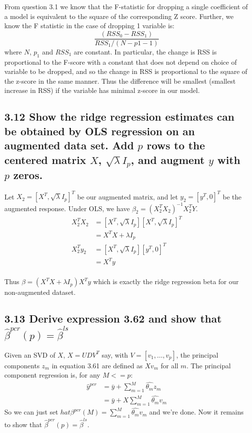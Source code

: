 From question 3.1 we know that the F-statistic for dropping a single coefficient of a model is equivalent to the square of the corresponding Z score.
Further, we know the F statistic in the case of dropping 1 variable is:
$$ \frac{\left(RSS_0 - RSS_1\right)}{RSS_1 / (N - p1 - 1)}$$
where $N$, $p_1$ and $RSS_1$ are constant. In particular, the change is RSS is proportional to the F-score with a constant that does not depend on choice of variable to be dropped, and so the change in RSS is proportional to the square of the z-score in the same manner. Thus the difference will be smallest (smallest increase in RSS) if the variable has minimal z-score in our model.
\subsection*{3.12 Show the ridge regression estimates can be obtained by OLS regression on an augmented data set. Add $p$ rows to the centered matrix $X$, $\sqrt{\lambda} I_p$, and augment $y$ with $p$ zeros.}

Let $X_2 = [X^T,\sqrt{\lambda} I_p]^T$ be our augmented matrix, and let $y_2 = [y^T,0]^T$ be the augmented response.
Under OLS, we have $\beta_2 = (X_2^T X_2)^{-1} X_2^T Y$.
\begin{align*}
X_2^T X_2 &= [X^T,\sqrt{\lambda} I_p] [X^T,\sqrt{\lambda} I_p]^T \\
&= X^T X + \lambda I_p\\
X_2^T y_2 &= [X^T,\sqrt{\lambda} I_p] [y^T,0]^T \\
&= X^T y\\
\end{align*}

Thus $\beta = \left(X^T X + \lambda I_p\right)X^T y$ which is exactly the ridge regression beta for our non-augmented dataset.





\subsection*{3.13 Derive expression 3.62 and show that $\hat{\beta}^{pcr}(p) = \hat{\beta}^{ls}$}

Given an SVD of $X$, $X = U D V^T$ say, with $V = [v_1,\dots,v_p]$, the principal components $z_m$ in equation 3.61 are defined as $X v_m$ for all $m$.
The principal component regression is, for any $M <= p$:
\begin{align*}
\hat{y}^{pcr} &= \bar{y} + \sum_{m=1}^{M} \hat{\theta_m}z_m\\    
&=  \bar{y} + X \sum_{m=1}^{M} \hat{\theta_m} v_m
\end{align*}
So we can just set $hat{\beta}^{pcr}(M) =  \sum_{m=1}^{M} \hat{\theta_m} v_m$ and we're done. 
Now it remains to show that  $\hat{\beta}^{pcr}(p) = \hat{\beta}^{ls}$.

